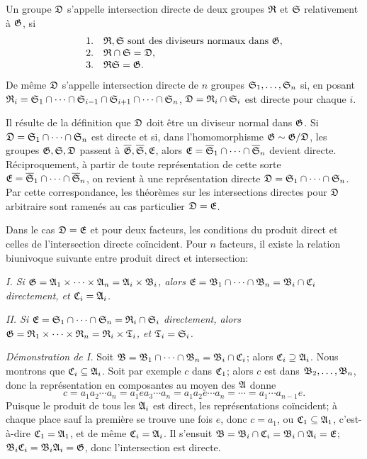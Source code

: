 Un groupe $\mathfrak{D}$ s'appelle intersection directe de deux groupes $\mathfrak{R}$ et $\mathfrak{S}$ relativement à $\mathfrak{G}$, si
\[
\begin{array}{ll}
1.& \mathfrak{R},\mathfrak{S}\text{ sont des diviseurs normaux dans }\mathfrak{G},\\
2.& \mathfrak{R}\cap\mathfrak{S}=\mathfrak{D},\\
3.& \mathfrak{R}\mathfrak{S}=\mathfrak{G}.
\end{array}
\]
De même $\mathfrak{D}$ s'appelle intersection directe de $n$ groupes $\mathfrak{S}_1,\ldots,\mathfrak{S}_n$ si, en posant $\mathfrak{R}_i=\mathfrak{S}_1\cap\cdots\cap\mathfrak{S}_{i-1}\cap\mathfrak{S}_{i+1}\cap\cdots\cap\mathfrak{S}_n$, $\mathfrak{D}=\mathfrak{R}_i\cap\mathfrak{S}_i$ est directe pour chaque $i$.

Il résulte de la définition que $\mathfrak{D}$ doit être un diviseur normal dans $\mathfrak{G}$. Si $\mathfrak{D}=\mathfrak{S}_1\cap\cdots\cap\mathfrak{S}_n$ est directe et si, dans l'homomorphisme $\mathfrak{G}\sim\mathfrak{G}/\mathfrak{D}$, les groupes $\mathfrak{G},\mathfrak{S},\mathfrak{D}$ passent à $\overline{\mathfrak{G}},\overline{\mathfrak{S}},\mathfrak{E}$, alors $\mathfrak{E}=\overline{\mathfrak{S}}_1\cap\cdots\cap\overline{\mathfrak{S}}_n$ devient directe. Réciproquement, à partir de toute représentation de cette sorte $\mathfrak{E}=\overline{\mathfrak{S}}_1\cap\cdots\cap\overline{\mathfrak{S}}_n$, on revient à une représentation directe $\mathfrak{D}=\mathfrak{S}_1\cap\cdots\cap\mathfrak{S}_n$. Par cette correspondance, les théorèmes sur les intersections directes pour $\mathfrak{D}$ arbitraire sont ramenés au cas particulier $\mathfrak{D}=\mathfrak{E}$.

Dans le cas $\mathfrak{D}=\mathfrak{E}$ et pour deux facteurs, les conditions du produit direct et celles de l'intersection directe coïncident. Pour $n$ facteurs, il existe la relation biunivoque suivante entre produit direct et intersection:

\emph{I. Si $\mathfrak{G}=\mathfrak{A}_1\times\cdots\times\mathfrak{A}_n=\mathfrak{A}_i\times\mathfrak{B}_i$, alors $\mathfrak{E}=\mathfrak{B}_1\cap\cdots\cap\mathfrak{B}_n=\mathfrak{B}_i\cap\mathfrak{C}_i$ directement, et $\mathfrak{C}_i=\mathfrak{A}_i$.}

\emph{II. Si $\mathfrak{E}=\mathfrak{S}_1\cap\cdots\cap\mathfrak{S}_n=\mathfrak{R}_i\cap\mathfrak{S}_i$ directement, alors $\mathfrak{G}=\mathfrak{R}_1\times\cdots\times\mathfrak{R}_n=\mathfrak{R}_i\times\mathfrak{T}_i$, et $\mathfrak{T}_i=\mathfrak{S}_i$.}

\emph{Démonstration de I.} Soit $\mathfrak{B}=\mathfrak{B}_1\cap\cdots\cap\mathfrak{B}_n=\mathfrak{B}_i\cap\mathfrak{C}_i$; alors $\mathfrak{C}_i\supseteq\mathfrak{A}_i$. Nous montrons que $\mathfrak{C}_i\subseteq\mathfrak{A}_i$. Soit par exemple $c$ dans $\mathfrak{C}_1$; alors $c$ est dans $\mathfrak{B}_2,\ldots,\mathfrak{B}_n$, donc la représentation en composantes au moyen des $\mathfrak{A}$ donne
\[
        c=a_1a_2\cdots a_n=a_1ea_3\cdots a_n=a_1a_2e\cdots a_n=\cdots=a_1\cdots a_{n-1}e.
\]
Puisque le produit de tous les $\mathfrak{A}_i$ est direct, les représentations coïncident; à chaque place sauf la première se trouve une fois $e$, donc $c=a_1$, ou $\mathfrak{C}_1\subseteq\mathfrak{A}_1$, c'est-à-dire $\mathfrak{C}_1=\mathfrak{A}_1$, et de même $\mathfrak{C}_i=\mathfrak{A}_i$. Il s'ensuit $\mathfrak{B}=\mathfrak{B}_i\cap\mathfrak{C}_i=\mathfrak{B}_i\cap\mathfrak{A}_i=\mathfrak{E}$; $\mathfrak{B}_i\mathfrak{C}_i=\mathfrak{B}_i\mathfrak{A}_i=\mathfrak{G}$, donc l'intersection est directe.

